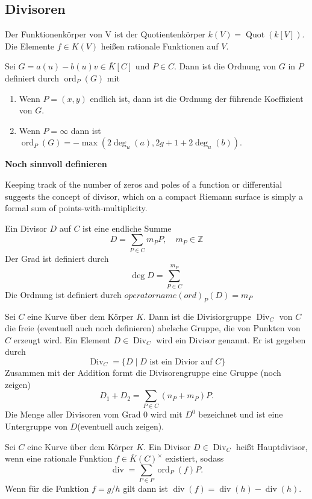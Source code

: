\subsection{Divisoren}
\begin{definition}
  Der Funktionenkörper von V ist der Quotientenkörper $k(V)=\operatorname{Quot}(k[V])$. Die Elemente $f\in K(V)$ heißen rationale Funktionen auf $V$.
\end{definition}
\begin{definition}
  Sei $G=a(u)-b(u)v\in \overline{K}[C]$ und $P\in C$. Dann ist die Ordnung von $G$ in $P$ definiert durch $\operatorname{ord}_P(G)$ mit
  \begin{enumerate}
    \item Wenn $P=(x,y)$ endlich ist, dann ist die Ordnung der führende Koeffizient von $G$.
    \item Wenn $P=\infty$ dann ist $\operatorname{ord}_P(G)=-\max(2\deg_u(a),2g+1+2\deg_u(b))$.
  \end{enumerate}
  \textbf{Noch sinnvoll definieren}
\end{definition}
\cite[S.14]{Menezes96}
Keeping track of the number of zeros and poles of a function or differential
suggests the concept of divisor, which on a compact Riemann surface is
simply a formal sum of points-with-multiplicity.
\begin{definition}[Divisor]
  Ein Divisor $D$ auf $C$ ist eine endliche Summe
  \[
    D=\sum_{P\in C}m_P P, \quad m_P\in\mathbb{Z}
  \]
  Der Grad ist definiert durch
  \[
    \deg D = \sum_{P\in C}^{m_P}
  \]
  Die Ordnung ist definiert durch $operatorname(ord)_P(D)=m_P$
\end{definition}
\cite[S.16]{Menezes96}
\cite[S.137--]{Hulek12}
\begin{definition}[Divisorgruppe]
  Sei $C$ eine Kurve über dem Körper $K$. Dann ist die Divisiorgruppe $\operatorname{Div}_C$ von $C$ die freie (eventuell auch noch definieren) abelsche Gruppe, die von Punkten von $C$ erzeugt wird. Ein Element $D\in\operatorname{Div}_C$ wird ein Divisor genannt. Er ist gegeben durch
  \[
    \operatorname{Div}_C=\{D\mid D\text{ ist ein Divior auf }C\}
  \]
  Zusammen mit der Addition formt die Divisorengruppe eine Gruppe (noch zeigen)
  \[
    D_1+D_2= \sum_{P\in C}(n_P+m_P)P.
  \]
  Die Menge aller Divisoren vom Grad 0 wird mit $D^0$ bezeichnet und ist eine Untergruppe von $D$(eventuell auch zeigen).
\end{definition}
\begin{definition}[Hauptdivisior]
  Sei $C$ eine Kurve über dem Körper $K$. Ein Divisor $D\in\operatorname{Div}_C$ heißt Hauptdivisor, wenn eine rationale Funktion $f\in\overline{K}(C)^\times$ existiert, sodass
  \[
    \operatorname{div}= \sum_{P\in P}\operatorname{ord}_P(f)P.
  \]
  Wenn für die Funktion $f=g/h$ gilt dann ist $\operatorname{div}(f)=\operatorname{div}(h)-\operatorname{div}(h)$.
\end{definition}
